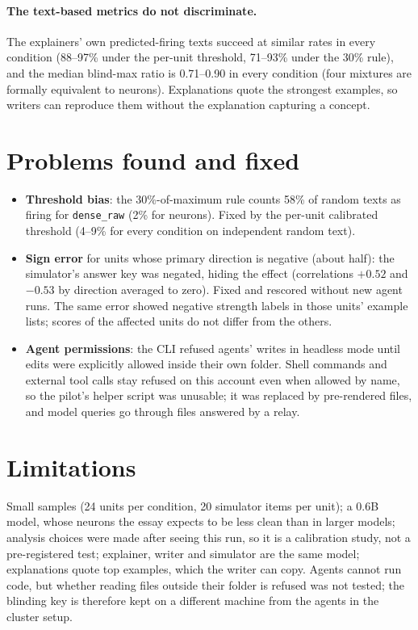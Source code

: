 \documentclass[11pt]{article}
\begin{document}
\paragraph{The text-based metrics do not discriminate.} The explainers' own predicted-firing texts succeed at similar rates in every
condition (88--97\% under the per-unit threshold, 71--93\% under the 30\% rule), and the median blind-max ratio is 0.71--0.90 in every condition (four
mixtures are formally equivalent to neurons). Explanations quote the strongest examples, so writers can reproduce
them without the explanation capturing a concept.

\section{Problems found and fixed}\label{sec:problems}
\begin{itemize}
\item \textbf{Threshold bias}: the 30\%-of-maximum rule counts 58\% of random texts as firing for \texttt{dense\_raw}
(2\% for neurons). Fixed by the per-unit calibrated threshold (4--9\% for every condition on independent random text).
\item \textbf{Sign error} for units whose primary direction is negative (about half): the simulator's answer key was
negated, hiding the effect (correlations $+0.52$ and $-0.53$ by direction averaged to zero). Fixed and rescored
without new agent runs. The same error showed negative strength labels in those units' example lists; scores of the
affected units do not differ from the others.
\item \textbf{Agent permissions}: the CLI refused agents' writes in headless mode until edits were explicitly allowed
inside their own folder. Shell commands and external tool calls stay refused on this account even when allowed by
name, so the pilot's helper script was unusable; it was replaced by pre-rendered files, and model queries go through
files answered by a relay.
\end{itemize}

\section{Limitations}
Small samples (24 units per condition, 20 simulator items per unit); a 0.6B model, whose neurons the essay expects to be
less clean than in larger models; analysis choices were made after seeing this run, so it is a calibration study, not a
pre-registered test; explainer, writer and simulator are the same model; explanations quote top examples, which the
writer can copy. Agents cannot run code, but whether reading files outside their folder is refused was not tested;
the blinding key is therefore kept on a different machine from the agents in the cluster setup.
\end{document}
